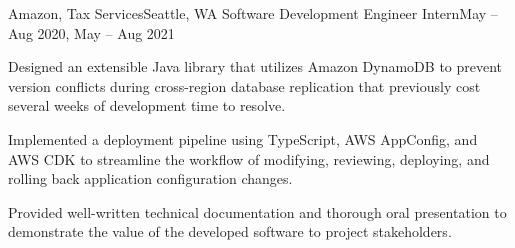 \begin{ritemize}
{Amazon, Tax Services}{Seattle, WA}
{Software Development Engineer Intern}{May -- Aug 2020, May -- Aug 2021}
	\item Designed an extensible Java library that utilizes Amazon DynamoDB to prevent version conflicts during cross-region database replication that previously cost several weeks of development time to resolve.
	\item Implemented a deployment pipeline using TypeScript, AWS AppConfig, and AWS CDK to streamline the workflow of modifying, reviewing, deploying, and rolling back application configuration changes.
	\item Provided well-written technical documentation and thorough oral presentation to demonstrate the value of the developed software to project stakeholders.
\end{ritemize}